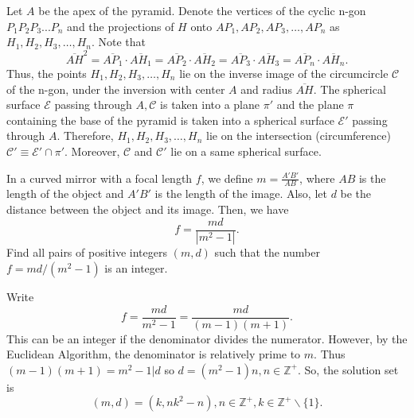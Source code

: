 \documentclass[12pt,a4paper]{memoir}
\theoremstyle{definition}
\begin{document}
\begin{solution}[name={Solution by Luis González}] 
	Let $A$ be the apex of the pyramid. Denote the vertices of the cyclic n-gon $P_1P_2P_3...P_n$ and the projections of $H$ onto $AP_1 , AP_2 , AP_3, \dots  ,AP_n$ as $H_1,H_2,H_3, \dots ,H_n$. Note that
	\[\overline{AH}^2=\overline{AP_1} \cdot \overline{AH_1}=\overline{AP_2} \cdot \overline{AH_2}=\overline{AP_3} \cdot \overline{AH_3}=\overline{AP_n} \cdot \overline{AH_n}.\]
	Thus, the points $H_1,H_2,H_3,\dots,H_n$ lie on the inverse image of the circumcircle $\mathcal{C}$ of the n-gon, under the inversion with center $A$ and radius $\overline{AH}.$ The spherical surface $\mathcal{E}$ passing through $A, \mathcal{C}$ is taken into a plane $\pi'$ and the plane $\pi$ containing the base of the pyramid is taken into a spherical surface $\mathcal{E}'$ passing through $A$. Therefore, $H_1,H_2,H_3,\dots,H_n$ lie on the intersection (circumference) $\mathcal{C}' \equiv \mathcal{E}' \cap \pi'.$ Moreover, $\mathcal{C}$ and $\mathcal{C}'$ lie on a same spherical surface.
\end{solution}





\begin{question}[name={Spherical Mirrors by Amir}]
	In a curved mirror with a focal length $f$, we define $m=\frac{A'B'}{AB}$, where $AB$ is the length of the object and $A'B'$ is the length of the image. Also, let $d$ be the distance between the object and its image. Then, we have $$f=\frac{md}{|m^2-1|}.$$ Find all pairs of positive integers $(m, d)$ such that the number $f=md/(m^2-1)$ is an integer.
\end{question}





\begin{solution}[name={Solution by JSGandora}] 
	Write $$f=\frac{md}{m^{2}-1}=\frac{md}{(m-1)(m+1)}.$$ This can be an integer if the denominator divides the numerator. However, by the Euclidean Algorithm, the denominator is relatively prime to $m$. Thus $(m-1)(m+1)=m^2-1|d$ so $d=(m^2-1)n, n\in\mathbb{Z^{+}}$. So, the solution set is \[(m,d)=(k, nk^2-n), n\in\mathbb{Z}^{+}, k\in\mathbb{Z}^{+}\backslash \{1\}.\]
\end{solution}
\end{document}
